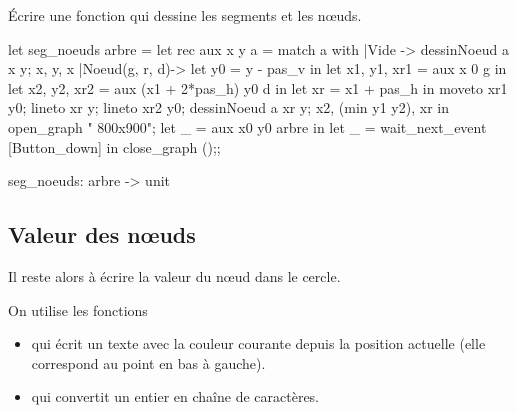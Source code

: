 \begin{question}{}{}
Écrire une fonction  qui dessine les segments et les nœuds.

\reponse
\begin{ocaml}
let seg_noeuds arbre =
    let rec aux x y a =
        match a with
        |Vide -> dessinNoeud a x y;
                 x, y, x
        |Noeud(g, r, d)-> 
                let y0 = y - pas_v in
                let x1, y1, xr1 = aux x 0 g in
                let x2, y2, xr2 = aux (x1 + 2*pas_h) y0 d in
                let xr = x1 + pas_h in
                moveto xr1 y0;
                lineto xr y;
                lineto xr2 y0;
                dessinNoeud a xr y;
                 x2, (min y1 y2), xr in
    open_graph " 800x900";
    let _ = aux x0 y0 arbre in
    let _ = wait_next_event [Button_down] in  close_graph ();;
\end{ocaml}
\end{question}

\begin{ocaml}
seg_noeuds: arbre -> unit
\end{ocaml}
\subsection{Valeur des nœuds}

Il reste alors à écrire la valeur du nœud dans le cercle.

On utilise les fonctions 
\begin{itemize}
  \item {} qui écrit un texte avec la couleur courante depuis la position actuelle (elle correspond au point en bas à gauche).
  \item {} qui convertit un entier en chaîne de caractères.
\end{itemize}

